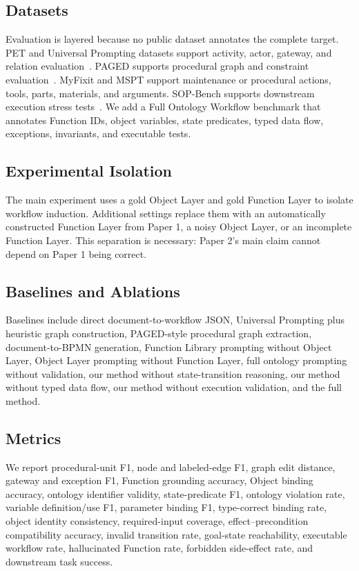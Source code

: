 \documentclass[10pt,twocolumn]{article}
\begin{document}
\subsection{Datasets}
Evaluation is layered because no public dataset annotates the complete target. PET and Universal Prompting datasets support activity, actor, gateway, and relation evaluation~\cite{bellan2022pet,neuberger2024universal}. PAGED supports procedural graph and constraint evaluation~\cite{du2024paged}. MyFixit and MSPT support maintenance or procedural actions, tools, parts, materials, and arguments. SOP-Bench supports downstream execution stress tests~\cite{nandi2025sopbench}. We add a Full Ontology Workflow benchmark that annotates Function IDs, object variables, state predicates, typed data flow, exceptions, invariants, and executable tests.

\subsection{Experimental Isolation}
The main experiment uses a gold Object Layer and gold Function Layer to isolate workflow induction. Additional settings replace them with an automatically constructed Function Layer from Paper 1, a noisy Object Layer, or an incomplete Function Layer. This separation is necessary: Paper 2's main claim cannot depend on Paper 1 being correct.

\subsection{Baselines and Ablations}
Baselines include direct document-to-workflow JSON, Universal Prompting plus heuristic graph construction, PAGED-style procedural graph extraction, document-to-BPMN generation, Function Library prompting without Object Layer, Object Layer prompting without Function Layer, full ontology prompting without validation, our method without state-transition reasoning, our method without typed data flow, our method without execution validation, and the full method.

\subsection{Metrics}
We report procedural-unit F1, node and labeled-edge F1, graph edit distance, gateway and exception F1, Function grounding accuracy, Object binding accuracy, ontology identifier validity, state-predicate F1, ontology violation rate, variable definition/use F1, parameter binding F1, type-correct binding rate, object identity consistency, required-input coverage, effect--precondition compatibility accuracy, invalid transition rate, goal-state reachability, executable workflow rate, hallucinated Function rate, forbidden side-effect rate, and downstream task success.
\end{document}
